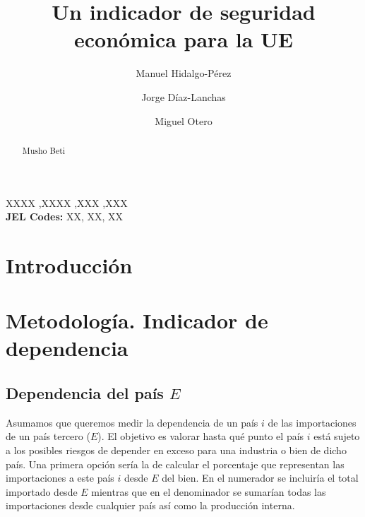 \documentclass[5p,authoryear]{elsarticle}
\begin{document}
\begin{frontmatter}

\title{Un indicador de seguridad económica para la UE}

\author[1]{Manuel Hidalgo-Pérez%
 }

\author[2]{Jorge Díaz-Lanchas}

\author[3]{Miguel Otero}







\begin{abstract}
Musho Beti
\end{abstract}

\begin{keyword}
XXXX \sep XXXX \sep XXX \sep XXX \\
\textbf{JEL Codes:} XX, XX, XX
\end{keyword}

\end{frontmatter}

\section{Introducción}

\section{Metodología. Indicador de dependencia}

\subsection{Dependencia del país $E$}

Asumamos que queremos medir la dependencia de un país $i$ de las importaciones de un país tercero ($E$). El objetivo es valorar hasta qué punto el país $i$ está sujeto a los posibles riesgos de depender en exceso para una industria o bien de dicho país. Una primera opción sería la de calcular el porcentaje que representan las importaciones a este país $i$ desde $E$ del bien. En el numerador se incluiría el total importado desde $E$ mientras que en el denominador se sumarían todas las importaciones desde cualquier país así como la producción interna.
\end{document}
